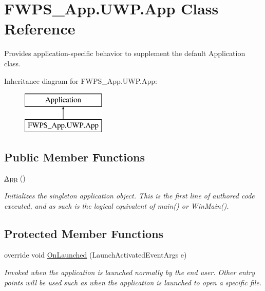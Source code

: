 \hypertarget{class_f_w_p_s___app_1_1_u_w_p_1_1_app}{}\section{F\+W\+P\+S\+\_\+\+App.\+U\+W\+P.\+App Class Reference}
\label{class_f_w_p_s___app_1_1_u_w_p_1_1_app}


Provides application-\/specific behavior to supplement the default Application class.  


Inheritance diagram for F\+W\+P\+S\+\_\+\+App.\+U\+W\+P.\+App\+:\begin{figure}[H]
\begin{center}
\leavevmode
\includegraphics[height=2.000000cm]{class_f_w_p_s___app_1_1_u_w_p_1_1_app}
\end{center}
\end{figure}
\subsection*{Public Member Functions}
\begin{DoxyCompactItemize}
\item 
\mbox{\hyperlink{class_f_w_p_s___app_1_1_u_w_p_1_1_app_a0ca7ede8a2837a53154f23c194dd2cd4}{App}} ()
\begin{DoxyCompactList}\small\item\em Initializes the singleton application object. This is the first line of authored code executed, and as such is the logical equivalent of main() or Win\+Main(). \end{DoxyCompactList}\end{DoxyCompactItemize}
\subsection*{Protected Member Functions}
\begin{DoxyCompactItemize}
\item 
override void \mbox{\hyperlink{class_f_w_p_s___app_1_1_u_w_p_1_1_app_aa860a1b3cbeaadd1496c79feb536729f}{On\+Launched}} (Launch\+Activated\+Event\+Args e)
\begin{DoxyCompactList}\small\item\em Invoked when the application is launched normally by the end user. Other entry points will be used such as when the application is launched to open a specific file. \end{DoxyCompactList}\end{DoxyCompactItemize}
